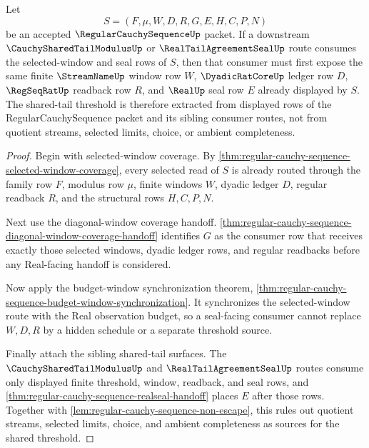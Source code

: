 \begin{theorem}
\label{thm:regular-cauchy-sequence-shared-tail-threshold-extraction}
Let
$$
S=(F,\mu,W,D,R,G,E,H,C,P,N)
$$
be an accepted $\RegularCauchySequenceUp$ packet. If a downstream $\CauchySharedTailModulusUp$ or $\RealTailAgreementSealUp$ route consumes the selected-window and seal rows of $S$, then that consumer must first expose the same finite $\StreamNameUp$ window row $W$, $\DyadicRatCoreUp$ ledger row $D$, $\RegSeqRatUp$ readback row $R$, and $\RealUp$ seal row $E$ already displayed by $S$. The shared-tail threshold is therefore extracted from displayed rows of the RegularCauchySequence packet and its sibling consumer routes, not from quotient streams, selected limits, choice, or ambient completeness.
\end{theorem}
\begin{proof}
Begin with selected-window coverage. By \autoref{thm:regular-cauchy-sequence-selected-window-coverage}, every selected read of $S$ is already routed through the family row $F$, modulus row $\mu$, finite windows $W$, dyadic ledger $D$, regular readback $R$, and the structural rows $H,C,P,N$.

Next use the diagonal-window coverage handoff. \autoref{thm:regular-cauchy-sequence-diagonal-window-coverage-handoff} identifies $G$ as the consumer row that receives exactly those selected windows, dyadic ledger rows, and regular readbacks before any Real-facing handoff is considered.

Now apply the budget-window synchronization theorem, \autoref{thm:regular-cauchy-sequence-budget-window-synchronization}. It synchronizes the selected-window route with the Real observation budget, so a seal-facing consumer cannot replace $W,D,R$ by a hidden schedule or a separate threshold source.

Finally attach the sibling shared-tail surfaces. The $\CauchySharedTailModulusUp$ and $\RealTailAgreementSealUp$ routes consume only displayed finite threshold, window, readback, and seal rows, and \autoref{thm:regular-cauchy-sequence-realseal-handoff} places $E$ after those rows. Together with \autoref{lem:regular-cauchy-sequence-non-escape}, this rules out quotient streams, selected limits, choice, and ambient completeness as sources for the shared threshold.
\end{proof}

